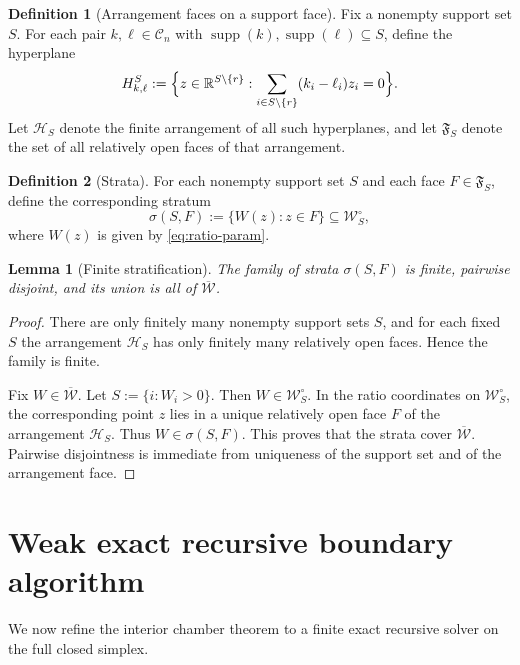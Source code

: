 \documentclass[11pt]{article}
\newtheorem{lemma}[lemma]{Lemma}
\theoremstyle{definition}
\newtheorem{definition}[definition]{Definition}
\newcommand{\R}{\mathbb{R}}
\newcommand{\1}{\mathbf{1}}
\newcommand{\supp}{\operatorname{supp}}
\begin{document}
\begin{definition}[Arrangement faces on a support face]
Fix a nonempty support set $S$. For each pair $k,\ell\in\mathcal C_n$ with $\supp(k),\supp(\ell)\subseteq S$, define the hyperplane
\[
H_{k,\ell}^S
:=
\Bigl\{z\in\R^{S\setminus\{r\}}:
\sum_{i\in S\setminus\{r\}} (k_i-\ell_i)z_i=0\Bigr\}.
\]
Let $\mathcal H_S$ denote the finite arrangement of all such hyperplanes, and let $\mathfrak F_S$ denote the set of all relatively open faces of that arrangement.
\end{definition}

\begin{definition}[Strata]
For each nonempty support set $S$ and each face $F\in\mathfrak F_S$, define the corresponding stratum
\[
\sigma(S,F):=\{W(z): z\in F\}\subseteq \mathcal W_S^\circ,
\]
where $W(z)$ is given by \eqref{eq:ratio-param}.
\end{definition}

\begin{lemma}[Finite stratification]\label{lem:finite-stratification}
The family of strata $\sigma(S,F)$ is finite, pairwise disjoint, and its union is all of $\overline{\mathcal W}$.
\end{lemma}

\begin{proof}
There are only finitely many nonempty support sets $S$, and for each fixed $S$ the arrangement $\mathcal H_S$ has only finitely many relatively open faces. Hence the family is finite.

Fix $W\in\overline{\mathcal W}$. Let $S:=\{i: W_i>0\}$. Then $W\in\mathcal W_S^\circ$. In the ratio coordinates on $\mathcal W_S^\circ$, the corresponding point $z$ lies in a unique relatively open face $F$ of the arrangement $\mathcal H_S$. Thus $W\in\sigma(S,F)$. This proves that the strata cover $\overline{\mathcal W}$. Pairwise disjointness is immediate from uniqueness of the support set and of the arrangement face.
\end{proof}

\section{Weak exact recursive boundary algorithm}\label{sec:weak-recursion}

We now refine the interior chamber theorem to a finite exact recursive solver on the full closed simplex.
\end{document}
